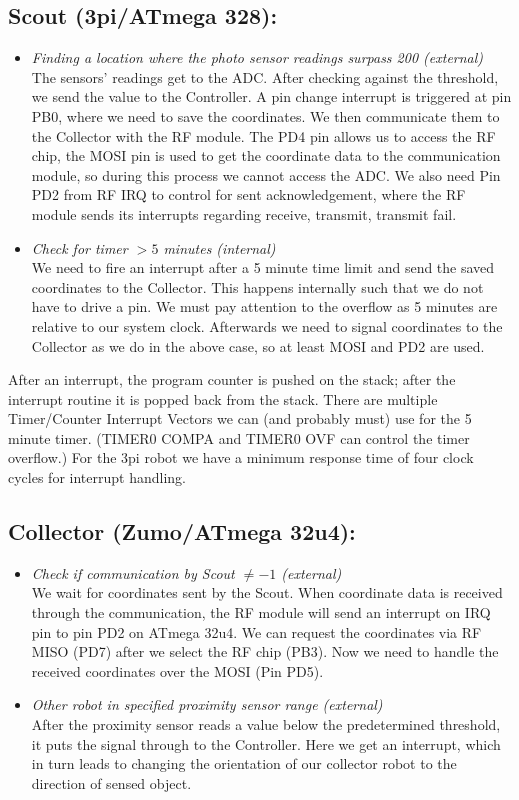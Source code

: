 \documentclass[12pt]{article}
\begin{document}
\subsection*{Scout (3pi/ATmega 328):}
\begin{itemize}
\item \textit{Finding a location where the photo sensor readings surpass 200 (external)}\\
The sensors' readings get to the ADC. After checking against the threshold, we send the value to the Controller. A pin change interrupt is triggered at pin PB0, where we need to save the coordinates. We then communicate them to the Collector with the RF module. The PD4 pin allows us to access the RF chip, the MOSI pin is used to get the coordinate data to the communication module, so during this process we cannot access the ADC. We also need Pin PD2 from RF IRQ to control for sent acknowledgement, where the RF module sends its interrupts regarding receive, transmit, transmit fail.
\item \textit{Check for timer $> 5$ minutes (internal)}\\
We need to fire an interrupt after a 5 minute time limit and send the saved coordinates to the Collector. This happens internally such that we do not have to drive a pin. We must pay attention to the overflow as 5 minutes are relative to our system clock. 
Afterwards we need to signal coordinates to the Collector as we do in the above case, so at least MOSI and PD2 are used.

\end{itemize}
After an interrupt, the program counter is pushed on the stack; after the interrupt routine it is popped back from the stack.
There are multiple Timer/Counter Interrupt Vectors we can (and probably must) use for the 5 minute timer.
(TIMER0 COMPA and TIMER0 OVF can control the timer overflow.)
For the 3pi robot we have a minimum response time of four clock cycles for interrupt handling. 

\subsection*{Collector (Zumo/ATmega 32u4):}
\begin{itemize}
\item \textit{Check if communication by Scout $\neq -1$ (external)}\\
We wait for coordinates sent by the Scout. When coordinate data is received through the communication, the RF module will send an interrupt on IRQ pin to pin PD2 on ATmega 32u4. We can request the coordinates via RF MISO (PD7) after we select the RF chip (PB3). Now we need to handle the received coordinates over the MOSI (Pin PD5). 
\item \textit{Other robot in specified proximity sensor range (external)}\\
After the proximity sensor reads a value below the predetermined threshold, it puts the signal through to the Controller. Here we get an interrupt, which in turn leads to changing the orientation of our collector robot to the direction of sensed object. 
\end{itemize} 
\end{document}
